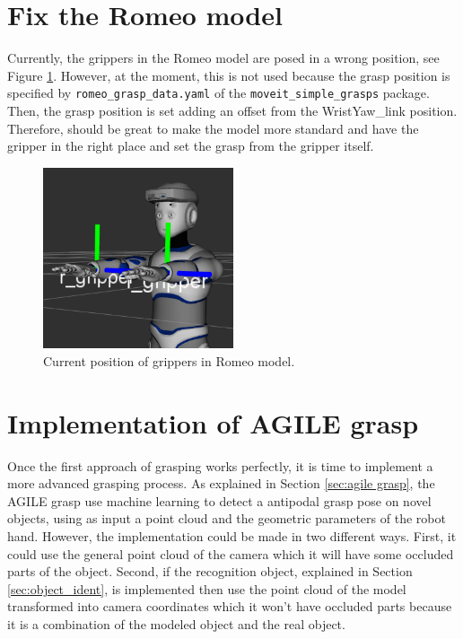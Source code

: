 \documentclass[12pt,a4paper,final,twoside,openright]{report}
\begin{document}
\section{Fix the Romeo model}

Currently, the grippers in the Romeo model are posed in a wrong position, see Figure \ref{fig:gripper_bad_position}. However, at the moment, this is not used because the grasp position is specified by \texttt{romeo\_grasp\_data.yaml} of the \texttt{moveit\_simple\_grasps} package. Then, the grasp position is set adding an offset from the WristYaw\_link position. Therefore, should be great to make the model more standard and have the gripper in the right place and set the grasp from the gripper itself. 

\begin{figure}[h]
\centering
\includegraphics[width=0.5\textwidth]{images/gripper_bad_position.png}
\caption{Current position of grippers in Romeo model.\label{fig:gripper_bad_position}}
\end{figure}

\section{Implementation of AGILE grasp}

Once the first approach of grasping works perfectly, it is time to implement a more advanced grasping process. As explained in Section \ref{sec:agile grasp}, the AGILE grasp use machine learning to detect a antipodal grasp pose on novel objects, using as input a point cloud and the geometric parameters of the robot hand. However, the implementation could be made in two different ways. First, it could use the general point cloud of the camera which it will have some occluded parts of the object. Second, if the recognition object, explained in Section \ref{sec:object_ident}, is implemented then use the point cloud of the model transformed into camera coordinates which it won't have occluded parts because it is a combination of the modeled object and the real object. 
\end{document}
